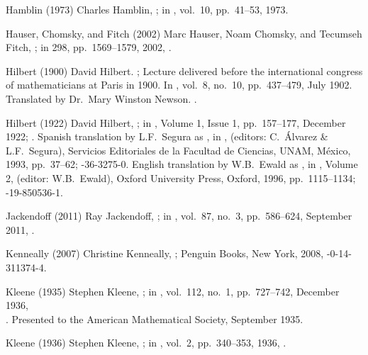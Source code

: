 \biblabel Hamblin (1973)
Charles Hamblin,
;
in ,
vol.\ 10, pp.\ 41--53, 1973.

\biblabel Hauser, Chomsky, and Fitch (2002)
Marc Hauser, Noam Chomsky, and Tecumseh Fitch,
;
in  298, pp.\ 1569--1579, 2002,
.

\biblabel Hilbert (1900)
David Hilbert.
;
Lecture delivered before the international
congress of mathematicians at Paris in 1900.
In ,
vol.\ 8, no.\ 10, pp.\ 437--479, July 1902.
Translated by Dr.\ Mary Winston Newson.
.

\biblabel Hilbert (1922)
David Hilbert,
;
in ,
Volume 1, Issue 1, pp.~157--177, December 1922;
.
Spanish translation by L.F.\ Segura as
,
in ,
 (editors: C.\ Álvarez \& L.F.\ Segura),
Servicios Editoriales de la Facultad de Ciencias, UNAM,
México, 1993, pp.~37--62;
-36-3275-0.
English translation by W.B.\ Ewald as
,
in , Volume 2,
 (editor: W.B.\ Ewald),
Oxford University Press, Oxford, 1996, pp.~1115--1134;
-19-850536-1.

\biblabel Jackendoff (2011)
Ray Jackendoff,
;
in ,
vol.\ 87, no.\ 3, pp.\ 586--624, September 2011,
.

\biblabel Kenneally (2007)
Christine Kenneally,
;
Penguin Books, New York, 2008,
-0-14-311374-4.

\biblabel Kleene (1935)
Stephen Kleene,
;
in ,
vol.\ 112, no.\ 1, pp.\ 727--742, December 1936,\\
.
Presented to the American Mathematical Society,
September 1935.

\biblabel Kleene (1936)
Stephen Kleene,
;
in ,
vol.\ 2, pp.\ 340--353, 1936,
.

